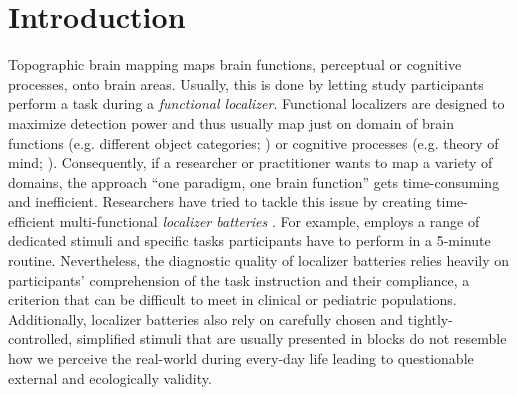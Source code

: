 \section{Introduction}






Topographic brain mapping maps brain functions, perceptual or cognitive
processes, onto brain areas.
Usually, this is done by letting study participants perform a task during a
\textit{functional localizer}.
Functional localizers are designed to maximize detection power and thus usually
map just on domain of brain functions (e.g. different object categories;
\citet{kanwisher1997ffa}) or cognitive processes (e.g. theory of mind;
\citet{spunt2014validating}).
Consequently, if a researcher or practitioner wants to map a variety of domains,
the approach ``one paradigm, one brain function'' gets time-consuming and
inefficient.
Researchers have tried to tackle this issue by creating time-efficient
multi-functional \textit{localizer batteries} \citep{pinel2007fast,
pinho2018individual, pinho2020individual}.
For example, \citet{pinel2007fast} employs a range of dedicated stimuli and
specific tasks participants have to perform in a 5-minute routine.
Nevertheless, the diagnostic quality of localizer batteries relies heavily on
participants' comprehension of the task instruction and their compliance, a
criterion that can be difficult to meet in clinical or pediatric populations.
Additionally, localizer batteries also rely on carefully chosen and
tightly-controlled, simplified stimuli that are usually presented in blocks do
not resemble how we perceive the real-world during every-day life leading to
questionable external and ecologically validity.


